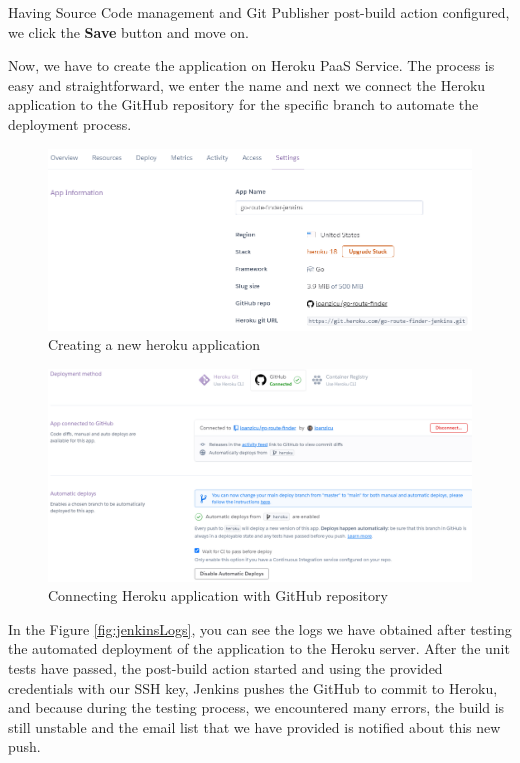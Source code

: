 \documentclass[12pt,a4paper,twoside]{article}
\begin{document}
Having Source Code management and Git Publisher post-build action configured, we click the \textbf{Save} button and move on.


Now, we have to create the application on Heroku PaaS Service. The process is easy and straightforward, we enter the name and next we connect the Heroku application to the GitHub repository for the specific branch to automate the deployment process.


\begin{figure}[H]
    \centering
        \includegraphics[width=15cm]{images-git-heroku/create-heroku-app.png}
        \caption{Creating a new heroku application}
\end{figure}


\begin{figure}[H]
    \centering
        \includegraphics[width=15cm]{images-git-heroku/connect-heroku-github.png}
        \caption{Connecting Heroku application with GitHub repository}
\end{figure}


In the Figure \ref{fig:jenkinsLogs}, you can see the logs we have obtained after testing the automated deployment of the application to the Heroku server. After the unit tests have passed, the post-build action started and using the provided credentials with our SSH key, Jenkins pushes the GitHub to commit to Heroku, and because during the testing process, we encountered many errors, the build is still unstable and the email list that we have provided is notified about this new push.
\end{document}
